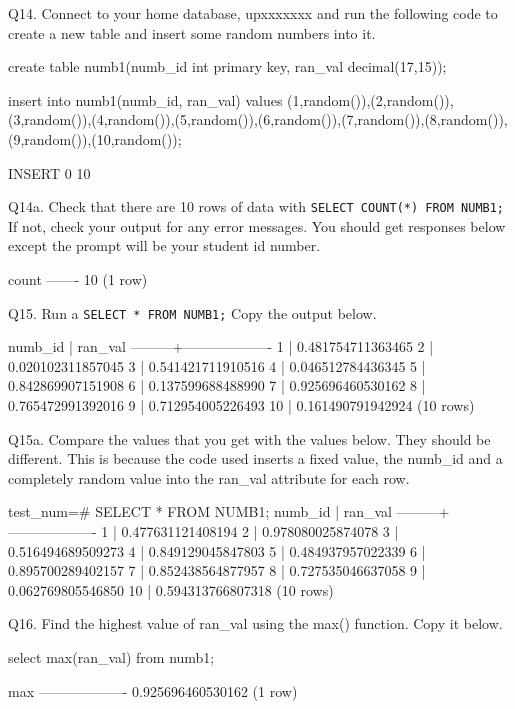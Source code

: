 Q14. Connect to your home database, upxxxxxxx and run the following code to create a new table and insert some random numbers into it. 
\begin{sql}
create table numb1(numb_id int primary key, ran_val decimal(17,15));

insert into numb1(numb_id, ran_val) values
(1,random()),(2,random()),(3,random()),(4,random()),(5,random()),(6,random()),(7,random()),(8,random()),(9,random()),(10,random());
\end{sql}
\begin{pseudo*}
    INSERT 0 10
\end{pseudo*}

Q14a. Check that there are 10 rows of data with \verb|SELECT COUNT(*) FROM NUMB1;|  If not, check your output for any error messages. You should get responses below except the prompt will be your student id number.
\begin{pseudo*}
 count 
-------
    10
(1 row)
\end{pseudo*}

Q15. Run a \verb|SELECT * FROM NUMB1;|  Copy the output below.
\begin{pseudo*}
 numb_id |      ran_val
---------+-------------------
       1 | 0.481754711363465
       2 | 0.020102311857045
       3 | 0.541421711910516
       4 | 0.046512784436345
       5 | 0.842869907151908
       6 | 0.137599688488990
       7 | 0.925696460530162
       8 | 0.765472991392016
       9 | 0.712954005226493
      10 | 0.161490791942924
(10 rows)
\end{pseudo*}


Q15a. Compare the values that you get with the values below. They should be different. This is because the code used inserts a fixed value, the numb\_id and a completely random value into the ran\_val attribute for each row. 
\begin{pseudo*}
test_num=# SELECT * FROM NUMB1;
 numb_id |  	ran_val
---------+-------------------
   	1 | 0.477631121408194
   	2 | 0.978080025874078
   	3 | 0.516494689509273
   	4 | 0.849129045847803
   	5 | 0.484937957022339
   	6 | 0.895700289402157
   	7 | 0.852438564877957
   	8 | 0.727535046637058
   	9 | 0.062769805546850
  	10 | 0.594313766807318
(10 rows)
\end{pseudo*}

Q16. Find the highest value of ran\_val using the max() function. Copy it below.
\begin{sql}
select max(ran_val) from numb1;
\end{sql}
\begin{pseudo*}
        max        
-------------------
 0.925696460530162
(1 row)
\end{pseudo*}

